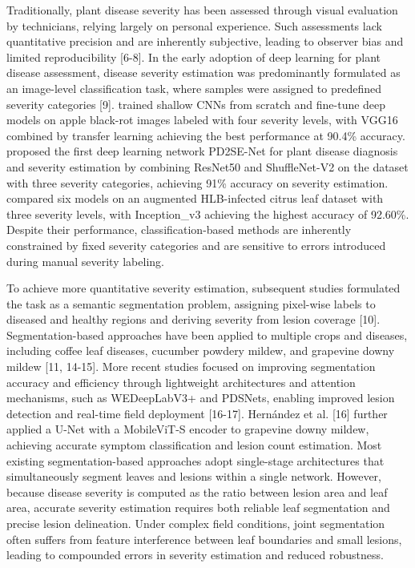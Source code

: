 \documentclass[
]{article}
\begin{document}
Traditionally, plant disease severity has been assessed through visual
evaluation by technicians, relying largely on personal experience. Such
assessments lack quantitative precision and are inherently subjective,
leading to observer bias and limited reproducibility {[}6-8{]}. In the
early adoption of deep learning for plant disease assessment, disease
severity estimation was predominantly formulated as an image-level
classification task, where samples were assigned to predefined severity
categories {[}9{]}. trained shallow CNNs from scratch and fine-tune deep
models on apple black-rot images labeled with four severity levels, with
VGG16 combined by transfer learning achieving the best performance at
90.4\% accuracy. proposed the first deep learning network PD2SE-Net for
plant disease diagnosis and severity estimation by combining ResNet50
and ShuffleNet-V2 on the dataset with three severity categories,
achieving 91\% accuracy on severity estimation. compared six models on
an augmented HLB-infected citrus leaf dataset with three severity
levels, with Inception\_v3 achieving the highest accuracy of 92.60\%.
Despite their performance, classification-based methods are inherently
constrained by fixed severity categories and are sensitive to errors
introduced during manual severity labeling.

To achieve more quantitative severity estimation, subsequent studies
formulated the task as a semantic segmentation problem, assigning
pixel-wise labels to diseased and healthy regions and deriving severity
from lesion coverage {[}10{]}. Segmentation-based approaches have been
applied to multiple crops and diseases, including coffee leaf diseases,
cucumber powdery mildew, and grapevine downy mildew {[}11, 14-15{]}.
More recent studies focused on improving segmentation accuracy and
efficiency through lightweight architectures and attention mechanisms,
such as WEDeepLabV3+ and PDSNets, enabling improved lesion detection and
real-time field deployment {[}16-17{]}. Hernández et al. {[}16{]}
further applied a U-Net with a MobileViT-S encoder to grapevine downy
mildew, achieving accurate symptom classification and lesion count
estimation. Most existing segmentation-based approaches adopt
single-stage architectures that simultaneously segment leaves and
lesions within a single network. However, because disease severity is
computed as the ratio between lesion area and leaf area, accurate
severity estimation requires both reliable leaf segmentation and precise
lesion delineation. Under complex field conditions, joint segmentation
often suffers from feature interference between leaf boundaries and
small lesions, leading to compounded errors in severity estimation and
reduced robustness.
\end{document}
